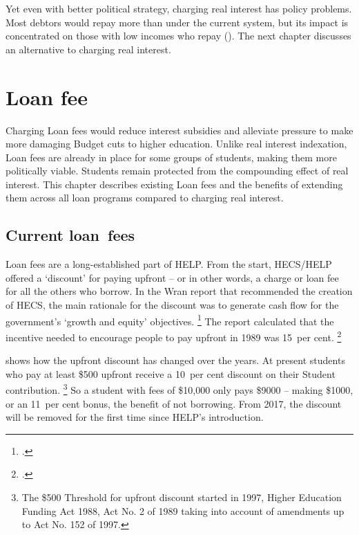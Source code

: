 \documentclass[embargoed]{grattan}
\begin{document}
Yet even with better political strategy, charging real interest has policy problems.
Most debtors would repay more than under the current system, but its impact is concentrated on those with low incomes who repay ().
The next chapter discusses an alternative to charging real interest.

\chapter{Loan fee}\label{chap:6-loan-fee}

Charging \gls{Loan fees} would reduce interest subsidies and alleviate pressure to make more damaging Budget cuts to higher education.
Unlike real interest indexation, \gls{Loan fees} are already in place for some groups of students, making them more politically viable.
Students remain protected from the compounding effect of real interest.
This chapter describes existing \gls{Loan fees} and the benefits of extending them across all loan programs compared to charging real interest.

\section{Current loan~fees}\label{sec:current-loan-fees}

\Gls{Loan fees} are a long-established part of \gls{HELP}\@.
From the start, \gls{HECS}/\gls{HELP} offered a `discount' for paying upfront -- or in other words, a charge or loan fee for all the others who borrow.
In the Wran report that recommended the creation of \gls{HECS}, the main rationale for the discount was to generate cash flow for the government's `growth and equity' objectives.%
\footcite[][79]{Wran1988ReportCommitteeHigher} %
The report calculated that the incentive needed to encourage people to pay upfront in 1989 was 15~per cent.%
\footcite[][93--94]{Wran1988ReportCommitteeHigher} 

 shows how the upfront discount has changed over the years.
At present students who pay at least \$500 upfront receive a 10~per cent discount on their \gls{Student contribution}.%
\footnote{The \$500 \gls{Threshold} for upfront discount started in 1997, Higher Education Funding Act 1988, Act No. 2 of 1989 taking into account of amendments up to Act No. 152 of 1997.} So a student with fees of \$10,000 only pays \$9000 -- making \$1000, or an 11~per cent bonus, the benefit of not borrowing.
From 2017, the discount will be removed for the first time since \gls{HELP}'s introduction.
\end{document}
